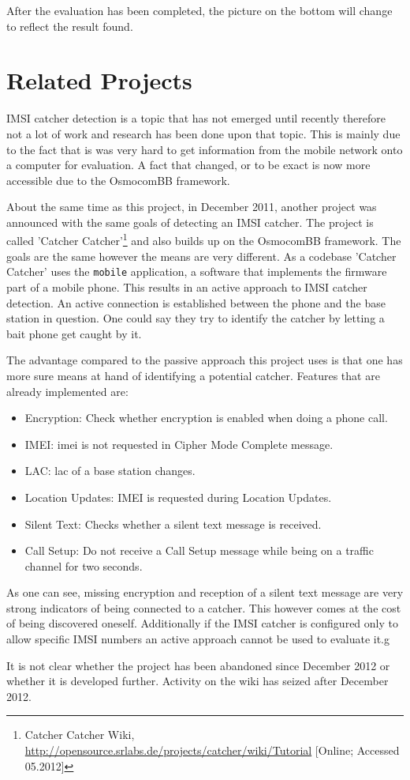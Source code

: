 After the evaluation has been completed, the picture on the bottom will change to reflect the result found.

\section{Related Projects}
IMSI catcher detection is a topic that has not emerged until recently therefore not a lot of work and research has been done upon that topic.
This is mainly due to the fact that is was very hard to get information from the mobile network onto a computer for evaluation.
A fact that changed, or to be exact is now more accessible due to the OsmocomBB framework.

About the same time as this project, in December 2011, another project was announced with the same goals of detecting an IMSI catcher.
The project is called 'Catcher Catcher'\footnote{Catcher Catcher Wiki, \url{http://opensource.srlabs.de/projects/catcher/wiki/Tutorial} [Online; Accessed 05.2012]} and also builds up on the OsmocomBB framework.
The goals are the same however the means are very different.
As a codebase 'Catcher Catcher' uses the \texttt{mobile} application, a software that implements the firmware part of a mobile phone.
This results in an active approach to IMSI catcher detection.
An active connection is established between the phone and the base station in question.
One could say they try to identify the catcher by letting a bait phone get caught by it.

The advantage compared to the passive approach this project uses is that one has more sure means at hand of identifying a potential catcher.
Features that are already implemented are\cite{catcher_catcher}:
\begin{itemize}
	\item Encryption: Check whether encryption is enabled when doing a phone call.
	\item IMEI: \gls{imei} is not requested in Cipher Mode Complete message.
	\item LAC: \gls{lac} of a base station changes.
	\item Location Updates: IMEI is requested during Location Updates.
	\item Silent Text: Checks whether a silent text message is received.
	\item Call Setup: Do not receive a Call Setup message while being on a traffic channel for two seconds.
\end{itemize}
As one can see, missing encryption and reception of a silent text message are very strong indicators of being connected to a catcher.
This however comes at the cost of being discovered oneself.
Additionally if the IMSI catcher is configured only to allow specific IMSI numbers an active approach cannot be used to evaluate it.g

It is not clear whether the project has been abandoned since December 2012 or whether it is developed further. 
Activity on the wiki has seized after December 2012.